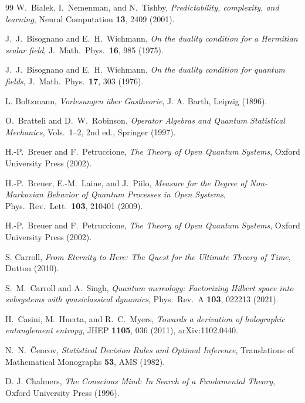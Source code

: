 \documentclass[12pt,a4paper,openany]{book}
\begin{document}
\begin{thebibliography}{99}
W.~Bialek, I.~Nemenman, and N.~Tishby,
\emph{Predictability, complexity, and learning},
Neural Computation \textbf{13}, 2409 (2001).

J.~J.~Bisognano and E.~H.~Wichmann,
\emph{On the duality condition for a Hermitian scalar field},
J.\ Math.\ Phys.\ \textbf{16}, 985 (1975).

J.~J.~Bisognano and E.~H.~Wichmann,
\emph{On the duality condition for quantum fields},
J.\ Math.\ Phys.\ \textbf{17}, 303 (1976).

L. Boltzmann, \emph{Vorlesungen \"uber Gastheorie}, J. A. Barth, Leipzig (1896).

O.~Bratteli and D.~W.~Robinson,
\emph{Operator Algebras and Quantum Statistical Mechanics},
Vols.\ 1--2, 2nd ed., Springer (1997).

H.-P.~Breuer and F.~Petruccione, \emph{The Theory of Open Quantum Systems}, Oxford University Press (2002).

H.-P.~Breuer, E.-M.~Laine, and J.~Piilo,
\emph{Measure for the Degree of Non-Markovian Behavior of Quantum Processes in Open Systems},
Phys.\ Rev.\ Lett.\ \textbf{103}, 210401 (2009).

H.-P.~Breuer and F.~Petruccione,
\emph{The Theory of Open Quantum Systems},
Oxford University Press (2002).

S. Carroll, \emph{From Eternity to Here: The Quest for the Ultimate Theory of Time}, Dutton (2010).

S.~M.~Carroll and A.~Singh,
\emph{Quantum mereology: Factorizing Hilbert space into subsystems with quasiclassical dynamics},
Phys.\ Rev.\ A \textbf{103}, 022213 (2021).

H.~Casini, M.~Huerta, and R.~C.~Myers,
\emph{Towards a derivation of holographic entanglement entropy},
JHEP \textbf{1105}, 036 (2011),
arXiv:1102.0440.

N.~N.~\v{C}encov,
\emph{Statistical Decision Rules and Optimal Inference},
Translations of Mathematical Monographs \textbf{53},
AMS (1982).

D. J. Chalmers, \emph{The Conscious Mind: In Search of a Fundamental Theory}, Oxford University Press (1996).



\end{thebibliography}
\end{document}

